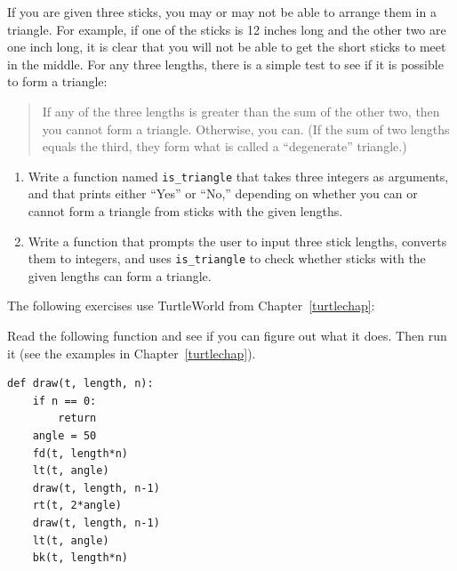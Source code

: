 \documentclass[10pt]{book}
\begin{document}
\begin{CJK}{UTF8}{gbsn}
\begin{exercise}

If you are given three sticks, you may or may not be able to arrange
them in a triangle.  For example, if one of the sticks is 12 inches
long and the other two are one inch long, it is clear that you will
not be able to get the short sticks to meet in the middle.  For any
three lengths, there is a simple test to see if it is possible to form
a triangle:

\begin{quotation}
If any of the three lengths is greater than the sum of the other
  two, then you cannot form a triangle.  Otherwise, you
  can.  (If the sum of two lengths equals the third, they form
    what is called a ``degenerate'' triangle.)
\end{quotation}

\begin{enumerate}

\item Write a function named \verb"is_triangle" that takes three
  integers as arguments, and that prints either ``Yes'' or ``No,'' depending
  on whether you can or cannot form a triangle from sticks with the
  given lengths.

\item Write a function that prompts the user to input three stick
  lengths, converts them to integers, and uses \verb"is_triangle" to
  check whether sticks with the given lengths can form a triangle.

\end{enumerate}

\end{exercise}

The following exercises use TurtleWorld from Chapter~\ref{turtlechap}:

\begin{exercise}

Read the following function and see if you can figure out
what it does.  Then run it (see the examples in Chapter~\ref{turtlechap}).

\begin{verbatim}
def draw(t, length, n):
    if n == 0:
        return
    angle = 50
    fd(t, length*n)
    lt(t, angle)
    draw(t, length, n-1)
    rt(t, 2*angle)
    draw(t, length, n-1)
    lt(t, angle)
    bk(t, length*n)
\end{verbatim}

\end{exercise}



\end{CJK}
\end{document}

